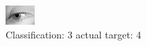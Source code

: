 \begin{figure}[h!]
\begin{center}
\includegraphics[width=0.60\columnwidth]{figures/ID2933_class_3_target_4.png}
\end{center}
\caption{ Classification: 3 actual target: 4}
\label{fig:ID2933_class_3_target_4}
\end{figure}

